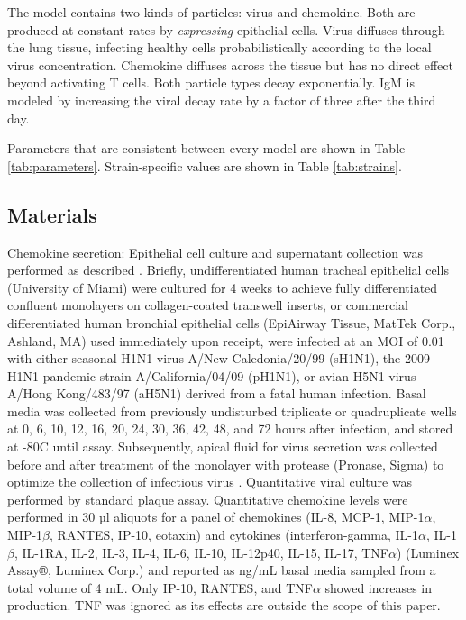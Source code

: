 \documentclass[10pt]{article}
\begin{document}
The model contains two kinds of particles: virus and chemokine. Both are produced at constant rates by \emph{expressing} epithelial cells.  Virus diffuses through the lung tissue, infecting healthy cells probabilistically according to the local virus concentration. Chemokine diffuses across the tissue but has no direct effect beyond activating T cells. Both particle types decay exponentially.  IgM is modeled by increasing the viral decay rate by a factor of three after the third day.

Parameters that are consistent between every model are shown in Table \ref{tab:parameters}.  Strain-specific values are shown in Table \ref{tab:strains}.


\subsection*{Materials}

Chemokine secretion:  Epithelial cell culture and supernatant collection was performed as described \cite{Mitchell2011}.  Briefly, undifferentiated human tracheal epithelial cells (University of Miami) were cultured for 4 weeks to achieve fully differentiated confluent monolayers on collagen-coated transwell inserts, or commercial differentiated human bronchial epithelial cells (EpiAirway Tissue, MatTek Corp., Ashland, MA) used immediately upon receipt, were infected at an MOI of 0.01 with either seasonal H1N1 virus A/New Caledonia/20/99 (sH1N1), the 2009 H1N1 pandemic strain A/California/04/09 (pH1N1), or avian H5N1 virus A/Hong Kong/483/97 (aH5N1) derived from a fatal human infection.  Basal media was collected from previously undisturbed triplicate or quadruplicate wells at 0, 6, 10, 12, 16, 20, 24, 30, 36, 42, 48, and 72 hours after infection, and stored at -80C until assay.  Subsequently, apical fluid for virus secretion was collected before and after treatment of the monolayer with protease (Pronase, Sigma) to optimize the collection of infectious virus \cite{Mitchell2011}.  Quantitative viral culture was performed by standard plaque assay.  Quantitative chemokine levels were performed in 30 µl aliquots for a panel of chemokines (IL-8, MCP-1, MIP-1$\alpha$, MIP-1$\beta$, RANTES, IP-10, eotaxin) and cytokines (interferon-gamma, IL-1$\alpha$, IL-1$\beta$, IL-1RA, IL-2, IL-3, IL-4, IL-6, IL-10, IL-12p40, IL-15, IL-17, TNF$\alpha$) (Luminex Assay®, Luminex Corp.) and reported as ng/mL basal media sampled from a total volume of 4 mL.  Only IP-10, RANTES, and TNF$\alpha$ showed increases in production.  TNF was ignored as its effects are outside the scope of this paper.
\end{document}
